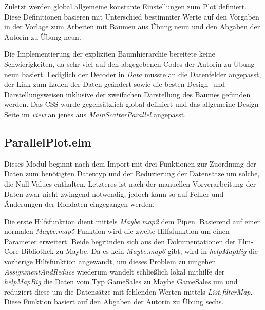 \documentclass[usegeometry=true]{scrartcl}
\begin{document}
Zuletzt werden global allgemeine konstante Einstellungen zum Plot definiert. 
Diese Definitionen basieren mit Unterschied bestimmter Werte auf den Vorgaben in der Vorlage zum Arbeiten mit Bäumen aus Übung neun und den Abgaben der Autorin zu Übung neun. 

Die Implementierung der expliziten Baumhierarchie bereitete keine Schwierigkeiten, da sehr viel auf den abgegebenen Codes der Autorin zu Übung neun basiert. 
Lediglich der Decoder in \textit{Data} musste an die Datenfelder angepasst, der Link zum Laden der Daten geändert sowie die besten Design- und Darstellungsweisen inklusive der zweifachen Darstellung des Baumes gefunden werden. 
Das CSS wurde gegensätzlich global definiert und das allgemeine Design Seite im \textit{view} an jenes aus \textit{MainScatterParallel} angepasst. 

\subsection{ParallelPlot.elm}
Dieses Modul beginnt nach dem Import mit drei Funktionen zur Zuordnung der Daten zum benötigten Datentyp und der Reduzierung der Datensätze um solche, die Null-Values enthalten. 
Letzteres ist nach der manuellen Vorverarbeitung der Daten zwar nicht zwingend notwendig, jedoch kann so auf Fehler und Änderungen der Rohdaten eingegangen werden. 

Die erste Hilfsfunktion dient mittels \textit{Maybe.map2} dem Pipen.
Basierend auf einer normalen \textit{Maybe.map5} Funktion wird die zweite Hilfsfunktion um einen Parameter erweitert. 
Beide begründen sich aus den Dokumentationen der Elm-Core-Bibliothek zu Maybe.%
Da es kein \textit{Maybe.map6} gibt, wird in \textit{helpMapBig} die vorherige Hilfsfunktion angewandt, um dieses Problem zu umgehen. 
\textit{AssignmentAndReduce} wiederum wandelt schließlich lokal mithilfe der \textit{helpMapBig} die Daten vom Typ GameSales zu Maybe GameSales um und reduziert diese um die Datensätze mit fehlenden Werten mittels \textit{List.filterMap}.
Diese Funktion basiert auf den Abgaben der Autorin zu Übung sechs.
\end{document}
